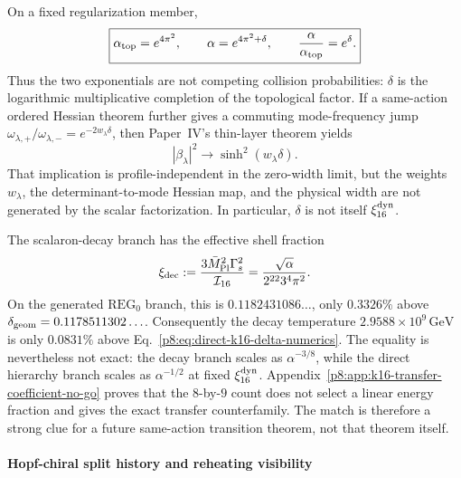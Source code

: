 \documentclass[12pt,a4paper]{article}
\begin{document}
\begin{remark}
\label{p8:rem:alpha-delta-squeeze-bridge}
On a fixed regularization member,
\begin{equation}
\label{p8:eq:alpha-delta-factorization}
 \boxed{\alpha_{\rm top}=e^{4\pi^2},\qquad
 \alpha=e^{4\pi^2+\delta},\qquad
 \frac{\alpha}{\alpha_{\rm top}}=e^\delta.}
\end{equation}
Thus the two exponentials are not competing collision probabilities:
\(\delta\) is the logarithmic multiplicative completion of the topological
factor.  If a same-action ordered Hessian theorem further gives a commuting
mode-frequency jump
\(\omega_{\lambda,+}/\omega_{\lambda,-}=e^{-2w_\lambda\delta}\), then
Paper~IV's thin-layer theorem yields
\[
 |\beta_\lambda|^2\longrightarrow\sinh^2(w_\lambda\delta).
\]
That implication is profile-independent in the zero-width limit, but the
weights \(w_\lambda\), the determinant-to-mode Hessian map, and the physical
width are not generated by the scalar factorization.  In particular,
\(\delta\) is not itself \(\xi_{16}^{\rm dyn}\).
\end{remark}

\begin{remark}
\label{p8:rem:direct-k16-delta-status}
The scalaron-decay branch has the effective shell fraction
\[
 \xi_{\rm dec}
 :=\frac{3\bar M_{\rm Pl}^{2}\Gamma_s^2}{\mathcal I_{16}}
 =\frac{\sqrt\alpha}
 {2^{22}3^4\pi^2}.
\]
On the generated \(\mathrm{REG}_0\) branch, this is
\(0.1182431086\ldots\), only \(0.3326\%\) above
\(\delta_{\rm geom}=0.1178511302\ldots\).  Consequently the decay
temperature \(2.9588\times10^9\,\mathrm{GeV}\) is only \(0.0831\%\) above
Eq.~\eqref{p8:eq:direct-k16-delta-numerics}.  The equality is nevertheless
not exact: the decay branch scales as
\(\alpha^{-3/8}\), while the direct hierarchy branch scales as
\(\alpha^{-1/2}\) at fixed \(\xi_{16}^{\rm dyn}\).
Appendix~\ref{p8:app:k16-transfer-coefficient-no-go} proves that the
\(8\)-by-\(9\) count does not select a linear energy fraction and gives the
exact transfer counterfamily.  The match is therefore a strong clue for a
future same-action transition theorem, not that theorem itself.
\end{remark}


\paragraph{Hopf-chiral split history and reheating visibility}
\label{p8:subsubsec:hopf-chiral-reheating-visibility}
\end{document}
